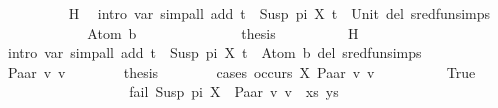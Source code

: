 \begin{isabellebody}
\ \ \ \ \ \ \ \ \isamarkupfalse%
\ H\ \isamarkupfalse%
\ {\isacharparenleft}{\kern0pt}intro\ var{\isacharunderscore}{\kern0pt}{}{\isacharparenright}{\kern0pt}\ {\isacharparenleft}{\kern0pt}simp{\isacharunderscore}{\kern0pt}all\ add{\isacharcolon}{\kern0pt}\ {\isacartoucheopen}t{}\ {\isacharequal}{\kern0pt}\ Susp\ pi\ X{\isacartoucheclose}\ {\isacartoucheopen}t{}\ {\isacharequal}{\kern0pt}\ Unit{\isacartoucheclose}\ del{\isacharcolon}{\kern0pt}\ sred{\isacharunderscore}{\kern0pt}fun{\isachardot}{\kern0pt}simps{\isacharparenright}{\kern0pt}\isanewline
\ \ \ \ \isamarkupfalse%
\isanewline
\ \ \ \ \ \ \isamarkupfalse%
\ {\isacharparenleft}{\kern0pt}Atom\ b{\isacharparenright}{\kern0pt}\isanewline
\ \ \ \ \ \ %
\isanewline
\ \ \ \ \ \ \isamarkupfalse%
\ {\isacharquery}{\kern0pt}thesis\isanewline
\ \ \ \ \ \ \ \ \isamarkupfalse%
\ H\ \isamarkupfalse%
\ {\isacharparenleft}{\kern0pt}intro\ var{\isacharunderscore}{\kern0pt}{}{\isacharparenright}{\kern0pt}\ {\isacharparenleft}{\kern0pt}simp{\isacharunderscore}{\kern0pt}all\ add{\isacharcolon}{\kern0pt}\ {\isacartoucheopen}t{}\ {\isacharequal}{\kern0pt}\ Susp\ pi\ X{\isacartoucheclose}\ {\isacartoucheopen}t{}\ {\isacharequal}{\kern0pt}\ Atom\ b{\isacartoucheclose}\ del{\isacharcolon}{\kern0pt}\ sred{\isacharunderscore}{\kern0pt}fun{\isachardot}{\kern0pt}simps{\isacharparenright}{\kern0pt}\isanewline
\ \ \ \ \isamarkupfalse%
\isanewline
\ \ \ \ \ \ \isamarkupfalse%
\ {\isacharparenleft}{\kern0pt}Paar\ v{}\ v{}{\isacharparenright}{\kern0pt}\isanewline
\ \ \ \ \ \ \isamarkupfalse%
\ {\isacharquery}{\kern0pt}thesis\isanewline
\ \ \ \ \ \ \isamarkupfalse%
\ {\isacharparenleft}{\kern0pt}cases\ {\isachardoublequoteopen}occurs\ X\ {\isacharparenleft}{\kern0pt}Paar\ v{}\ v{}{\isacharparenright}{\kern0pt}{\isachardoublequoteclose}{\isacharparenright}{\kern0pt}\isanewline
\ \ \ \ \ \ \ \ \isamarkupfalse%
\ True\isanewline
\ \ \ \ \ \ \ \ %
\isanewline
\ \ \ \ \ \ \ \ \isamarkupfalse%
\ {\isachardoublequoteopen}fail\ {\isacharparenleft}{\kern0pt}{\isacharparenleft}{\kern0pt}Susp\ pi\ X\ {\isasymapprox}{\isacharquery}{\kern0pt}\ Paar\ v{}\ v{}{\isacharparenright}{\kern0pt}\ {\isacharhash}{\kern0pt}\ xs{\isacharcomma}{\kern0pt}\ ys{\isacharparenright}{\kern0pt}{\isachardoublequoteclose}\isanewline

\end{isabellebody}

